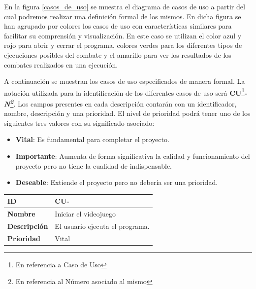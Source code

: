 \clearpage

En la figura \ref{casos_de_uso} se muestra el diagrama de casos de uso a partir del cual podremos realizar una definición formal de los mismos. En dicha figura se han agrupado por colores los casos de uso con características similares para facilitar su comprensión y visualización. En este caso se utilizan el color azul y rojo para abrir y cerrar el programa, colores verdes para los diferentes tipos de ejecuciones posibles del combate y el amarillo para ver los resultados de los combates realizados en una ejecución.

\bigskip

A continuación se muestran los casos de uso especificados de manera formal. La notación utilizada para la identificación de los diferentes casos de uso será \textbf{CU\footnote{En referencia a Caso de Uso}-\textit{N\footnote{En referencia al Número asociado al mismo}}}. Los campos presentes en cada descripción contarán con un identificador, nombre, descripción y una prioridad. El nivel de prioridad podrá tener uno de los siguientes tres valores con su significado asociado:

\begin{itemize}
\item \textbf{Vital}: Es fundamental para completar el proyecto.
\item \textbf{Importante}: Aumenta de forma significativa la calidad y funcionamiento del proyecto pero no tiene la cualidad de indispensable.
\item \textbf{Deseable}: Extiende el proyecto pero no debería ser una prioridad.
\end{itemize}

\bigskip



\setcounter{contador_casos_de_uso}{1}

\begin{center}
	\begin{tabular}{ | p{3cm} | p{10cm} | } 
		\hline
		
			\textbf{ID} & CU-\arabic{contador_casos_de_uso}
			{contador_casos_de_uso} \\
		
		\hline 
		
			\textbf{Nombre} &
			Iniciar el videojuego \\ 
		
		\hline
		
			\textbf{Descripción} & 
			El usuario ejecuta el programa.\\
		
		\hline 
		
			\textbf{Prioridad} &
			Vital\\ 
		
		\hline
	\end{tabular}
\end{center}

